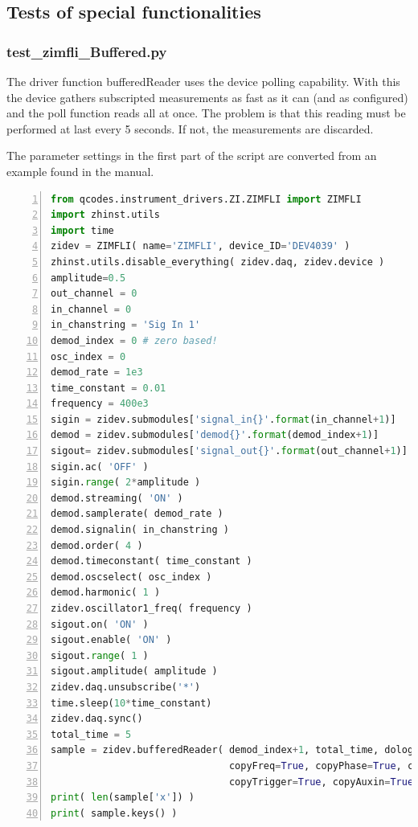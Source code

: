 \documentclass[11pt]{article} %
\begin{document}
\subsection{Tests of special functionalities}

\subsubsection{test\_zimfli\_Buffered.py}
The driver function bufferedReader uses the device polling capability. With this the device gathers subscripted measurements as fast as it can (and as configured) and the poll function reads all at once. The problem is that this reading must be performed at last every 5 seconds. If not, the measurements are discarded.

The parameter settings in the first part of the script are converted from an example found in the manual.
\begin{lstlisting}[frame=single, language=Python, numbers=left, xleftmargin=1cm]
from qcodes.instrument_drivers.ZI.ZIMFLI import ZIMFLI
import zhinst.utils
import time
zidev = ZIMFLI( name='ZIMFLI', device_ID='DEV4039' )
zhinst.utils.disable_everything( zidev.daq, zidev.device )
amplitude=0.5
out_channel = 0
in_channel = 0
in_chanstring = 'Sig In 1'
demod_index = 0 # zero based!
osc_index = 0
demod_rate = 1e3
time_constant = 0.01
frequency = 400e3
sigin = zidev.submodules['signal_in{}'.format(in_channel+1)]
demod = zidev.submodules['demod{}'.format(demod_index+1)]
sigout= zidev.submodules['signal_out{}'.format(out_channel+1)]
sigin.ac( 'OFF' )
sigin.range( 2*amplitude )
demod.streaming( 'ON' )
demod.samplerate( demod_rate )
demod.signalin( in_chanstring )
demod.order( 4 )
demod.timeconstant( time_constant )
demod.oscselect( osc_index )
demod.harmonic( 1 )
zidev.oscillator1_freq( frequency )
sigout.on( 'ON' )
sigout.enable( 'ON' )
sigout.range( 1 )
sigout.amplitude( amplitude )
zidev.daq.unsubscribe('*')
time.sleep(10*time_constant)
zidev.daq.sync()
total_time = 5
sample = zidev.bufferedReader( demod_index+1, total_time, dolog=True,
                               copyFreq=True, copyPhase=True, copyDIO=True,
                               copyTrigger=True, copyAuxin=True )
print( len(sample['x']) )
print( sample.keys() )
\end{lstlisting}
\end{document}
